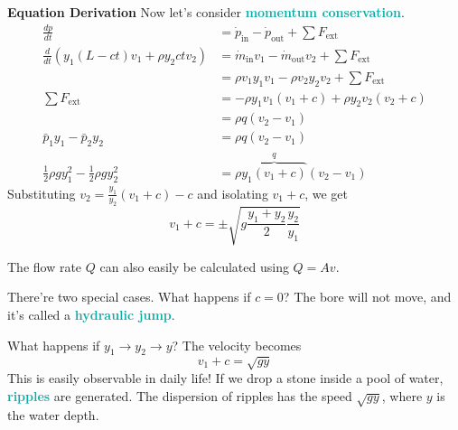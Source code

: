 \documentclass[twoside]{article}
\newcommand{\derivation}[1]{\begin{derivationbox} \emoji{pineapple} \textbf{Equation Derivation} \newline #1 \end{derivationbox}}
\newcommand{\highlightbluetext}[1]{\textcolor[HTML]{09ACA6}{\textbf{#1}}}
\numberwithin{equation}{section}
\begin{document}
	\derivation{
		Now let's consider \highlightbluetext{momentum conservation}.
		\begin{align*}
			\frac{dp}{dt} &= \dot{p}_{\text{in}}-\dot{p}_{\text{out}}+\sum F_{\text{ext}} \\
			\frac{d}{dt} \left( y_1(L-ct)v_1+\rho y_2ctv_2 \right) &= \dot{m}_{\text{in}}v_1-\dot{m}_{\text{out}}v_2+\sum F_{\text{ext}} \\
			&= \rho v_1y_1v_1-\rho v_2y_2v_2+\sum F_{\text{ext}} \\
			\sum F_{\text{ext}} &= -\rho y_1v_1(v_1+c)+\rho y_2v_2(v_2+c) \\
			&= \rho q(v_2-v_1) \\
			\bar{p}_1y_1-\bar{p}_2y_2 &= \rho q(v_2-v_1) \\
			\frac{1}{2} \rho gy_1^2-\frac{1}{2} \rho gy_2^2 &= \rho \overbrace{y_1(v_1+c)}^q (v_2-v_1)
		\end{align*}
		Substituting $v_2 = \frac{y_1}{y_2} (v_1+c)-c$ and isolating $v_1+c$, we get
		\begin{equation}
			v_1+c = \pm \sqrt{g\frac{y_1+y_2}{2} \frac{y_2}{y_1}}
			\label{eq:HydraulicBoreVelocity}
		\end{equation}
	}
	
	The flow rate $Q$ can also easily be calculated using $Q = Av$.
	
	There're two special cases. What happens if $c = 0$? The bore will not move, and it's called a \highlightbluetext{hydraulic jump}.
	
	What happens if $y_1 \to y_2 \to y$? The velocity becomes
	\begin{equation}
		v_1+c = \sqrt{gy}
		\label{eq:HydraulicJumpSameWaterDepth}
	\end{equation}
	This is easily observable in daily life! If we drop a stone inside a pool of water, \highlightbluetext{ripples} are generated. The dispersion of ripples has the speed $\sqrt{gy}$, where $y$ is the water depth.
	
	\newpage
	
\end{document}
